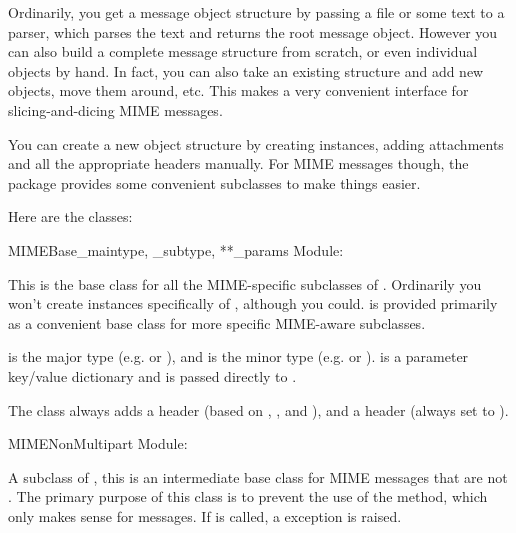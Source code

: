 Ordinarily, you get a message object structure by passing a file or
some text to a parser, which parses the text and returns the root
message object.  However you can also build a complete message
structure from scratch, or even individual  objects by
hand.  In fact, you can also take an existing structure and add new
 objects, move them around, etc.  This makes a very
convenient interface for slicing-and-dicing MIME messages.

You can create a new object structure by creating  instances,
adding attachments and all the appropriate headers manually.  For MIME
messages though, the  package provides some convenient
subclasses to make things easier.

Here are the classes:

\begin{classdesc}{MIMEBase}{_maintype, _subtype, **_params}
Module: 

This is the base class for all the MIME-specific subclasses of
.  Ordinarily you won't create instances specifically
of , although you could.   is provided
primarily as a convenient base class for more specific MIME-aware
subclasses.

 is the  major type
(e.g.  or ), and  is the
 minor type 
(e.g.  or ).   is a parameter
key/value dictionary and is passed directly to
.

The  class always adds a  header
(based on , , and ), and a
 header (always set to ).
\end{classdesc}

\begin{classdesc}{MIMENonMultipart}{}
Module: 

A subclass of , this is an intermediate base class for
MIME messages that are not .  The primary purpose
of this class is to prevent the use of the  method,
which only makes sense for  messages.  If
 is called, a 
exception is raised.

\end{classdesc}

